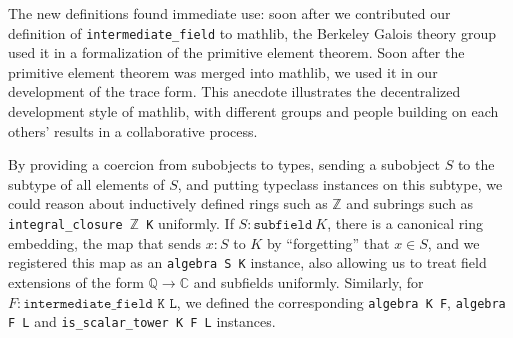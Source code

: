 \documentclass[a4paper,USenglish,cleveref, autoref, thm-restate]{lipics-v2021}
\newcommand{\C}{\mathbb{C}}
\newcommand{\lean}[1]{\texttt{#1}\xspace} %
\newcommand{\mathlib}{\textsf{mathlib}\xspace}
\newcommand{\Q}{\mathbb{Q}}
\newcommand{\Z}{\mathbb{Z}}
\begin{document}
The new definitions found immediate use:
soon after we contributed our definition of \lean{intermediate\_field} to \mathlib,
the Berkeley Galois theory group used it in a formalization of the primitive element theorem.
Soon after the primitive element theorem was merged into \mathlib,
we used it in our development of the trace form.
This anecdote illustrates the decentralized development style of \mathlib,
with different groups and people building on each others' results in a collaborative process.

By providing a coercion from subobjects to types, sending a subobject $S$ to the subtype of all elements of $S$,
and putting typeclass instances on this subtype,
we could reason about inductively defined rings such as $\Z$ and subrings such as \lean{integral\_closure $\Z$ K} uniformly.
If $S : \lean{subfield}\ K$, there is a canonical ring embedding, the map that sends $x : S$ to $K$ by ``forgetting'' that $x \in S$,
and we registered this map as an \lean{algebra S K} instance, also allowing us to treat field extensions of the form $\Q \to \C$ and subfields uniformly.
Similarly, for $F : \lean{intermediate\_field K L}$, we defined the corresponding \lean{algebra K F}, \lean{algebra F L} and \lean{is\_scalar\_tower K F L} instances.
\end{document}
